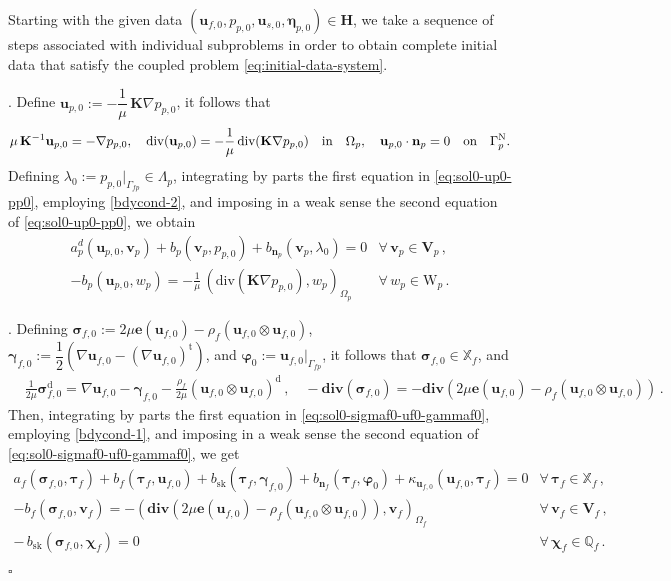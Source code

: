 \documentclass[11pt]{article}
\numberwithin{equation}{section}
\newcommand{\ds}{\displaystyle}
\newcommand{\bgamma}{{\boldsymbol\gamma}}
\newcommand{\bbeta}{{\boldsymbol\eta}}
\newcommand{\bsi}{{\boldsymbol\sigma}}
\newcommand{\bvarphi}{{\boldsymbol\varphi}}
\newcommand{\btau}{{\boldsymbol\tau}}
\newcommand{\bchi}{{\boldsymbol\chi}}
\newcommand{\bv}{{\mathbf{v}}}
\newcommand{\bu}{\mathbf{u}}
\newcommand{\bn}{{\mathbf{n}}}
\newcommand{\be}{{\mathbf{e}}}
\newcommand{\0}{{\mathbf{0}}}
\def\bK{\mathbf{K}}
\def\bV{\mathbf{V}}
\newcommand\bH{\mathbf{H}}
\newcommand\bbQ{\mathbb{Q}}
\newcommand\bbX{\mathbb{X}}
\def\W{\mathrm{W}}
\def\rd{\mathrm{d}}
\def\rN{\mathrm{N}}
\def\rt{\mathrm{t}}
\def\bdiv{\mathbf{div}}
\def\div{\mathrm{div}}
\def\sk{\mathrm{sk}}
\def\qin{{\quad\hbox{in}\quad}}
\def\qon{{\quad\hbox{on}\quad}}
\newenvironment{proof}{\noindent{\it Proof.}}{\hfill$\square$}
\numberwithin{equation}{section}
\begin{document}
\begin{proof}
Starting with the given data $(\bu_{f,0},p_{p,0},\bu_{s,0},\bbeta_{p,0})\in \bH$, we take a sequence of steps associated with individual subproblems in order to obtain complete initial data that satisfy the coupled problem \eqref{eq:initial-data-system}. 

. Define $\bu_{p,0} := -\dfrac{1}{\mu}\,\bK\nabla p_{p,0}$, it follows that
%
\begin{equation}\label{eq:sol0-up0-pp0}
\mu\,\bK^{-1}\bu_{p,0} = -\nabla p_{p,0},\quad 
\div(\bu_{p,0}) = -\frac{1}{\mu}\,\div(\bK\nabla p_{p,0}) \qin \Omega_p,\quad
\bu_{p,0}\cdot\bn_p = 0 \qon \Gamma^{\rN}_p.
\end{equation}
%
Defining $\lambda_0 := p_{p,0}|_{\Gamma_{fp}}\in \Lambda_p$, integrating by parts the first equation in \eqref{eq:sol0-up0-pp0}, employing \eqref{bdycond-2}, and imposing in a weak sense the second equation of \eqref{eq:sol0-up0-pp0}, we obtain
\begin{equation}\label{eq:system-sol0-1}
\begin{array}{ll}
a^d_p(\bu_{p,0},\bv_p) + b_p(\bv_p,p_{p,0}) + b_{\bn_p}(\bv_p,\lambda_0) = 0 & \forall\,\bv_p\in \bV_p\,, \\[2ex]
-b_p(\bu_{p,0},w_p) = \ds -\frac{1}{\mu}\,(\div(\bK\nabla p_{p,0}),w_p)_{\Omega_p} & \forall\,w_p\in \W_p\,.
\end{array} 
\end{equation}

. Defining $\bsi_{f,0} := 2\mu\be(\bu_{f,0}) - \rho_f(\bu_{f,0}\otimes\bu_{f,0})$, $\bgamma_{f,0} := \dfrac{1}{2}\left( \nabla\bu_{f,0} - (\nabla\bu_{f,0})^\rt \right)$, and $\bvarphi_0 := \bu_{f,0}|_{\Gamma_{fp}}$, it follows that $\bsi_{f,0}\in \bbX_f$, and
\begin{align}
& \frac{1}{2\mu}\bsi^\rd_{f,0} = \nabla\bu_{f,0} - \bgamma_{f,0} - \frac{\rho_f}{2\mu}(\bu_{f,0}\otimes\bu_{f,0})^\rd\,,\quad
-\bdiv(\bsi_{f,0}) = -\bdiv(2\mu\be(\bu_{f,0}) - \rho_f(\bu_{f,0}\otimes \bu_{f,0}))\,. \label{eq:sol0-sigmaf0-uf0-gammaf0}
\end{align}
Then, integrating by parts the first equation in \eqref{eq:sol0-sigmaf0-uf0-gammaf0}, employing  \eqref{bdycond-1}, and imposing in a weak sense the second equation of \eqref{eq:sol0-sigmaf0-uf0-gammaf0}, we get
\begin{equation}\label{eq:system-sol0-2}
\begin{array}{ll}
a_f(\bsi_{f,0},\btau_f) + b_f(\btau_f,\bu_{f,0}) + b_{\sk}(\btau_f,\bgamma_{f,0}) + b_{\bn_f}(\btau_f,\bvarphi_0) + \kappa_{\bu_{f,0}}(\bu_{f,0},\btau_f) = 0 & \forall\,\btau_f\in \bbX_f\,, \\[2ex]
- b_f(\bsi_{f,0},\bv_f) = - (\bdiv(2\mu\be(\bu_{f,0}) - \rho_f(\bu_{f,0}\otimes\bu_{f,0})),\bv_f)_{\Omega_f} & \forall\,\bv_f\in \bV_f\,, \\[2ex]
-\,b_{\sk}(\bsi_{f,0},\bchi_f) = 0 & \forall\,\bchi_f\in \bbQ_f\,.
\end{array} 
\end{equation}


\end{proof}
\end{document}
